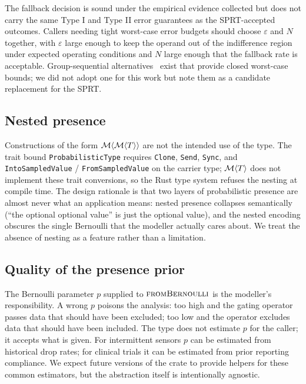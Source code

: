 The fallback decision is sound under the empirical evidence collected but
does not carry the same Type I and Type II error guarantees as the
SPRT-accepted outcomes. Callers needing tight worst-case error budgets
should choose $\varepsilon$ and $N$ together, with $\varepsilon$ large
enough to keep the operand out of the indifference region under expected
operating conditions and $N$ large enough that the fallback rate is
acceptable. Group-sequential alternatives~\cite{jennison2000groupseq}
exist that provide closed worst-case bounds; we did not adopt one for
this work but note them as a candidate replacement for the SPRT.

\subsection{Nested presence}
\label{sec:disc:nesting}

Constructions of the form $\mathcal{M}\langle \mathcal{M}\langle T \rangle \rangle$
are not the intended use of the type. The trait bound
\texttt{ProbabilisticType} requires \texttt{Clone}, \texttt{Send},
\texttt{Sync}, and \texttt{IntoSampledValue} / \texttt{FromSampledValue}
on the carrier type; $\mathcal{M}\langle T \rangle$ does not implement these
trait conversions, so the Rust type system refuses the nesting at
compile time. The design rationale is that two layers of probabilistic
presence are almost never what an application means: nested presence
collapses semantically (``the optional optional value'' is just the
optional value), and the nested encoding obscures the single Bernoulli
that the modeller actually cares about. We treat the absence of nesting
as a feature rather than a limitation.

\subsection{Quality of the presence prior}
\label{sec:disc:prior}

The Bernoulli parameter $p$ supplied to $\textsc{fromBernoulli}$ is the
modeller's responsibility. A wrong $p$ poisons the analysis: too high
and the gating operator passes data that should have been excluded; too
low and the operator excludes data that should have been included. The
type does not estimate $p$ for the caller; it accepts what is given. For
intermittent sensors $p$ can be estimated from historical drop rates;
for clinical trials it can be estimated from prior reporting compliance.
We expect future versions of the crate to provide helpers for these
common estimators, but the abstraction itself is intentionally agnostic.

